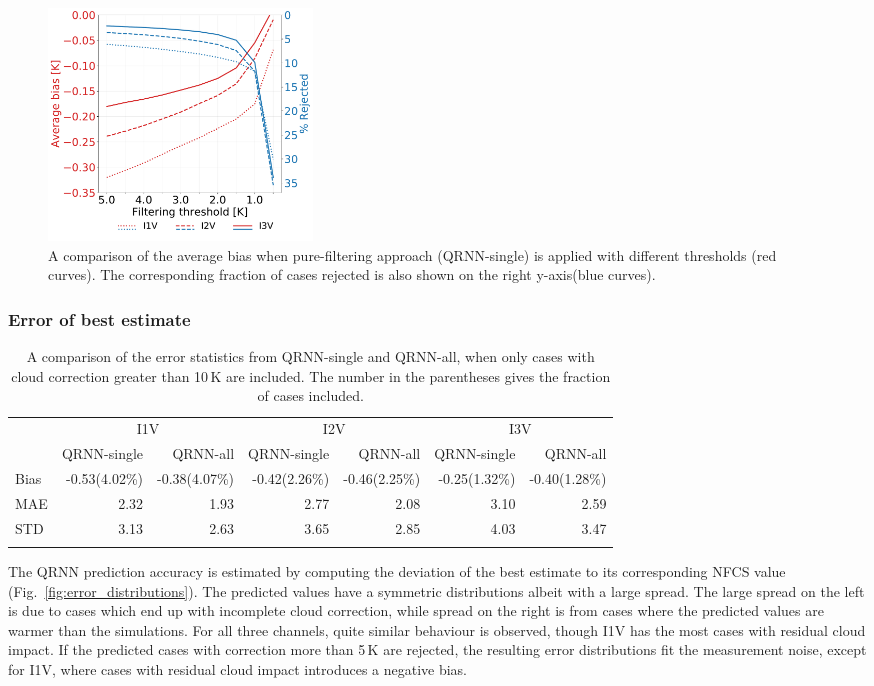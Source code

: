 \documentclass[amt, manuscript]{copernicus}
\begin{document}
\begin{figure}[t]
	\includegraphics[width=70mm]{Figures/different_filtering_thresholds.pdf} 
	\caption{A comparison of the  average bias when pure-filtering approach (QRNN-single) is applied with different thresholds (red curves). The corresponding fraction of cases rejected is also shown on the right y-axis(blue curves).}
	\label{fig:filtering_thresholds}	
\end{figure} 

\subsubsection{Error of best estimate}  
%
\begin{table}[t]
	\caption{A comparison of the error statistics from QRNN-single and QRNN-all, when only cases with cloud correction greater than 10\,K are included. The number in the parentheses gives the fraction of cases included.}
	\label{tab:error_statistics_ici_high_cloud_impact}
	\begin{tabular}{lrr|rr|rr}
		\tophline
		&\multicolumn{2}{c|}{I1V}& \multicolumn{2}{c|}{I2V} & \multicolumn{2}{c}{I3V}\\
		\cline{2-7}
		&QRNN-single& QRNN-all & QRNN-single & QRNN-all  & QRNN-single & QRNN-all\\
		\middlehline
		Bias     & -0.53(4.02\%) & -0.38(4.07\%)  & -0.42(2.26\%) & -0.46(2.25\%) & -0.25(1.32\%) & -0.40(1.28\%) \\
		MAE      &  2.32 &  1.93  &  2.77 &  2.08 &  3.10 &  2.59 \\
		STD      &  3.13 &  2.63  &  3.65 &  2.85 &  4.03 &  3.47 \\
		\bottomhline
	\end{tabular}
	\belowtable{} %
\end{table}

The QRNN prediction accuracy is estimated by computing the deviation of the best estimate to its corresponding NFCS value (Fig.~\ref{fig:error_distributions}). The predicted values have a symmetric distributions albeit with a large spread. The large spread on the left is due to cases which end up with incomplete cloud correction, while spread on the right is from cases where the predicted values are warmer than the simulations. For all three channels, quite similar behaviour is observed, though I1V has the most cases with residual cloud impact. If the predicted cases with correction more than 5\,K are rejected, the resulting error distributions fit the measurement noise, except for I1V, where cases with residual cloud impact introduces a negative bias. 
\end{document}

